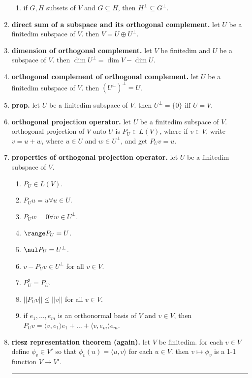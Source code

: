\begin{enumerate}
\begin{enumerate}
		\item if $G,H$ subsets of $V$ and $G \subseteq H$, then $H^\perp \subseteq G^\perp$. 
	\end{enumerate}
	\item \textbf{direct sum of a subspace and its orthogonal complement. } let $U$ be a finitedim subspace of $V$. then $V = U \oplus U^\perp$. 
	\item \textbf{dimension of orthogonal complement. } let $V$ be finitedim and $U$ be a subspace of $V$. then $\dim U^\perp = \dim V - \dim U$. 
	\item \textbf{orthogonal complement of orthogonal complement. } let $U$ be a finitedim subspace of $V$. then $(U^\perp)^\perp = U$. 
	\item \textbf{prop. } let $U$ be a finitedim subspace of $V$. then $U^\perp = \{0\}$ iff $U=V$. 
	\item \textbf{orthogonal projection operator. } let $U$ be a finitedim subspace of $V$. orthogonal projection of $V$ onto $U$ is $P_U \in L(V)$, where if $v \in V$, write $v = u+w$, where $u \in U$ and $w \in U^\perp$, and get $P_U v = u$. 
	\item \textbf{properties of orthogonal projection operator. } let $U$ be a finitedim subspace of $V$. 
	\begin{enumerate}
		\item $P_U \in L(V)$. 
		\item $P_U u = u \forall u \in U$. 
		\item $P_U w = 0 \forall w \in U^\perp$. 
		\item $\range P_U = U$. 
		\item $\nul P_U = U^\perp$. 
		\item $v - P_U v \in U^\perp$ for all $v \in V$. 
		\item $P_U^2 = P_U$. 
		\item $||P_U v || \leq ||v||$ for all $v \in V$. 
		\item if $e_1,\dots,e_m$ is an orthonormal basis of $V$ and $v \in V$, then $P_U v = \langle v,e_1 \rangle e_1 + \dots + \langle v,e_m \rangle e_m$. 
	\end{enumerate}
	\item \textbf{riesz representation theorem (again). } let $V$ be finitedim. for each $v \in V$ define $\phi_v \in V'$ so that $\phi_v (u) = \langle u,v \rangle$ for each $u \in V$. then $v \mapsto \phi_v$ is a 1-1 function $V \to V'$. 
	\begin{center}
		\hrule
	\end{center}

\end{enumerate}
